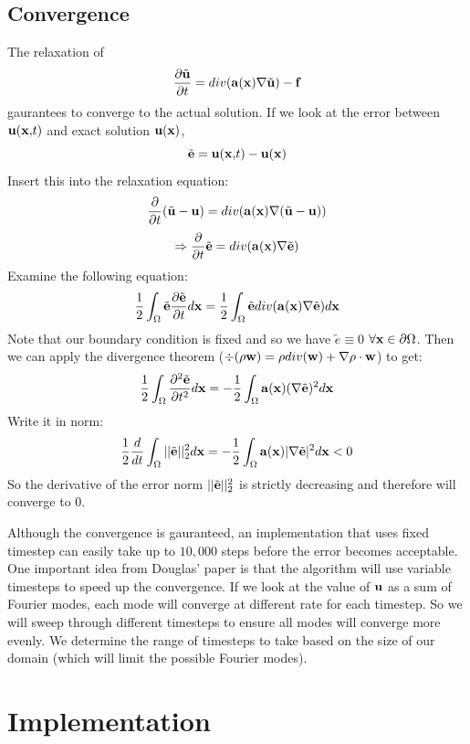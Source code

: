 \documentclass[a4paper,11pt]{article}
\begin{document}
\begin{multicols}{2}
	\subsection{Convergence}
	\par The relaxation of 
	\[\frac{\partial \tilde{\bf u}}{\partial t} = div({\bf a}({\bf x})\nabla\tilde{\bf u}) - {\bf f}\]
	gaurantees to converge to the actual solution. If we look at the error between ${\bf u(x,}t)$ and exact solution $\bf u(x)$, 
	\[\tilde{\bf e} = {\bf u(x,} t) - {\bf u(x)}\]
	Insert this into the relaxation equation:
	\[\frac{\partial }{\partial t}(\tilde{\bf u} - {\bf u}) = div({\bf a}({\bf x})\nabla(\tilde{\bf u}-{\bf u}))\]
	\[\Rightarrow \frac{\partial }{\partial t} {\tilde{\bf e}} = div({\bf a}({\bf x})\nabla\tilde{\bf e})\]
	Examine the following equation:
	\[\frac{1}{2}\int_{\Omega} \tilde{\bf e}\frac{\partial \tilde{\bf e}}{\partial t}d{\bf x} = \frac{1}{2}\int_{\Omega}\tilde{\bf e}div({\bf a}({\bf x})\nabla\tilde{\bf e})d{\bf x}\]
	Note that our boundary condition is fixed and so we have $\tilde{e} \equiv 0$ $\forall {\bf x} \in\partial\Omega$. Then we can apply the divergence theorem ($\div(\rho{\bf w}) = \rho div({\bf w}) + \nabla \rho\cdot {\bf w}$) to get:
	\[\frac{1}{2}\int_{\Omega}\frac{\partial^2 \tilde{\bf e}}{\partial t^2}d{\bf x} = -\frac{1}{2}\int_{\Omega}{\bf a}({\bf x})(\nabla\tilde{\bf e})^2d{\bf x}\]
	Write it in norm:
	\[\frac{1}{2}\frac{d}{dt}\int_{\Omega}||\tilde{\bf e}||_2^2d{\bf x} = -\frac{1}{2}\int_{\Omega}{\bf a}({\bf x})|\nabla\tilde{\bf e}|^2d{\bf x} < 0\]
	So the derivative of the error norm $||\tilde{\bf e}||_2^2$ is strictly decreasing and therefore will converge to $0$.
	\par Although the convergence is gauranteed, an implementation that uses fixed timestep can easily take up to $10,000$ steps before the error becomes acceptable. One important idea from Douglas' paper is that the algorithm will use variable timesteps to speed up the convergence. If we look at the value of ${\bf u}$ as a sum of Fourier modes, each mode will converge at different rate for each timestep. So we will sweep through different timesteps to ensure all modes will converge more evenly. We determine the range of timesteps to take based on the size of our domain (which will limit the possible Fourier modes).
\section{Implementation}

\end{multicols}
\end{document}
